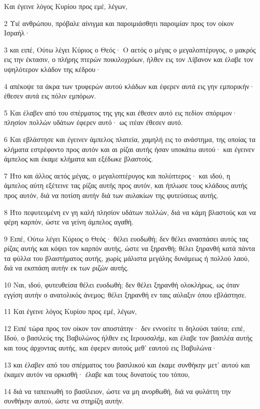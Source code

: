 \par Και έγεινε λόγος Κυρίου προς εμέ, λέγων,
\par 2 Υιέ ανθρώπου, πρόβαλε αίνιγμα και παροιμιάσθητι παροιμίαν προς τον οίκον Ισραήλ·
\par 3 και ειπέ, Ούτω λέγει Κύριος ο Θεός· Ο αετός ο μέγας ο μεγαλοπτέρυγος, ο μακρός εις την έκτασιν, ο πλήρης πτερών ποικιλοχρόων, ήλθεν εις τον Λίβανον και έλαβε τον υψηλότερον κλάδον της κέδρου·
\par 4 απέκοψε τα άκρα των τρυφερών αυτού κλάδων και έφερεν αυτά εις γην εμπορικήν· έθεσεν αυτά εις πόλιν εμπόρων.
\par 5 Και έλαβεν από του σπέρματος της γης και έθεσεν αυτό εις πεδίον σπόριμον· πλησίον πολλών υδάτων έφερεν αυτό· ως ιτέαν έθεσεν αυτό.
\par 6 Και εβλάστησε και έγεινεν άμπελος πλατεία, χαμηλή εις το ανάστημα, της οποίας τα κλήματα εστρέφοντο προς αυτόν και αι ρίζαι αυτής ήσαν υποκάτω αυτού· και έγεινεν άμπελος και έκαμε κλήματα και εξέδωκε βλαστούς.
\par 7 Ήτο και άλλος αετός μέγας, ο μεγαλοπτέρυγος και πολύπτερος· και ιδού, η άμπελος αύτη εξέτεινε τας ρίζας αυτής προς αυτόν, και ήπλωσε τους κλάδους αυτής προς αυτόν, διά να ποτίση αυτήν διά των αυλακίων της φυτεύσεως αυτής.
\par 8 Ήτο πεφυτευμένη εν γη καλή πλησίον υδάτων πολλών, διά να κάμη βλαστούς και να φέρη καρπόν, ώστε να γείνη άμπελος αγαθή.
\par 9 Ειπέ, Ούτω λέγει Κύριος ο Θεός· θέλει ευοδωθή; δεν θέλει ανασπάσει αυτός τας ρίζας αυτής και κόψει τον καρπόν αυτής, ώστε να ξηρανθή; θέλει ξηρανθή κατά πάντα τα φύλλα του βλαστήματος αυτής, χωρίς μάλιστα μεγάλης δυνάμεως ή πολλού λαού, διά να εκσπάση αυτήν εκ των ριζών αυτής.
\par 10 Ναι, ιδού, φυτευθείσα θέλει ευοδωθή; δεν θέλει ξηρανθή ολοκλήρως, ως όταν εγγίση αυτήν ο ανατολικός άνεμος; θέλει ξηρανθή εν ταις αύλαξιν όπου εβλάστησε.
\par 11 Και έγεινε λόγος Κυρίου προς εμέ, λέγων,
\par 12 Ειπέ τώρα προς τον οίκον τον αποστάτην· δεν εννοείτε τι δηλούσι ταύτα; ειπέ, Ιδού, ο βασιλεύς της Βαβυλώνος ήλθεν εις Ιερουσαλήμ, και έλαβε τον βασιλέα αυτής και τους άρχοντας αυτής, και έφερεν αυτούς μεθ' εαυτού εις Βαβυλώνα·
\par 13 και έλαβεν από του σπέρματος του βασιλικού και έκαμε συνθήκην μετ' αυτού και έκαμεν αυτόν να ορκισθή· έλαβε και τους δυνατούς του τόπου,
\par 14 διά να ταπεινωθή το βασίλειον, ώστε να μη ανορθωθή, διά να φυλάττη την συνθήκην αυτού, ώστε να στηρίζη αυτήν.
